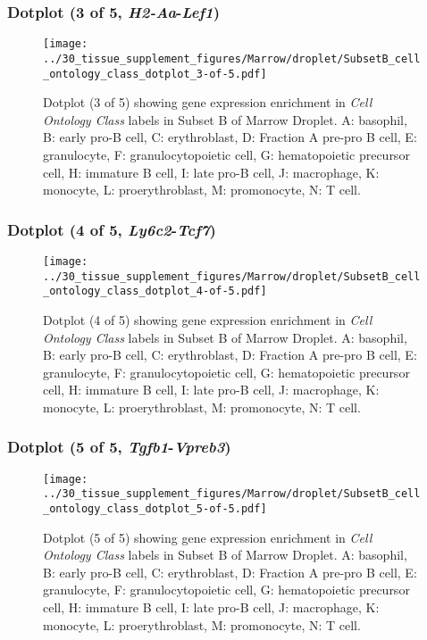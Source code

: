 \clearpage

\subsubsection{Dotplot (3 of 5, \emph{H2-Aa}-\emph{Lef1})}
\begin{figure}[h]
\centering
\texttt{[image: ../30\_tissue\_supplement\_figures/Marrow/droplet/SubsetB\_cell\_ontology\_class\_dotplot\_3-of-5.pdf]}

\caption{ Dotplot (3 of 5)  showing gene expression enrichment in \emph{Cell Ontology Class} labels in Subset B of Marrow Droplet. A: basophil, B: early pro-B cell, C: erythroblast, D: Fraction A pre-pro B cell, E: granulocyte, F: granulocytopoietic cell, G: hematopoietic precursor cell, H: immature B cell, I: late pro-B cell, J: macrophage, K: monocyte, L: proerythroblast, M: promonocyte, N: T cell.}
\end{figure}


\clearpage

\subsubsection{Dotplot (4 of 5, \emph{Ly6c2}-\emph{Tcf7})}
\begin{figure}[h]
\centering
\texttt{[image: ../30\_tissue\_supplement\_figures/Marrow/droplet/SubsetB\_cell\_ontology\_class\_dotplot\_4-of-5.pdf]}

\caption{ Dotplot (4 of 5)  showing gene expression enrichment in \emph{Cell Ontology Class} labels in Subset B of Marrow Droplet. A: basophil, B: early pro-B cell, C: erythroblast, D: Fraction A pre-pro B cell, E: granulocyte, F: granulocytopoietic cell, G: hematopoietic precursor cell, H: immature B cell, I: late pro-B cell, J: macrophage, K: monocyte, L: proerythroblast, M: promonocyte, N: T cell.}
\end{figure}


\clearpage

\subsubsection{Dotplot (5 of 5, \emph{Tgfb1}-\emph{Vpreb3})}
\begin{figure}[h]
\centering
\texttt{[image: ../30\_tissue\_supplement\_figures/Marrow/droplet/SubsetB\_cell\_ontology\_class\_dotplot\_5-of-5.pdf]}

\caption{ Dotplot (5 of 5)  showing gene expression enrichment in \emph{Cell Ontology Class} labels in Subset B of Marrow Droplet. A: basophil, B: early pro-B cell, C: erythroblast, D: Fraction A pre-pro B cell, E: granulocyte, F: granulocytopoietic cell, G: hematopoietic precursor cell, H: immature B cell, I: late pro-B cell, J: macrophage, K: monocyte, L: proerythroblast, M: promonocyte, N: T cell.}
\end{figure}


